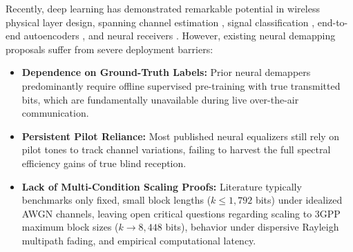 \documentclass[journal]{IEEEtran}
\begin{document}
Recently, deep learning has demonstrated remarkable potential in wireless physical layer design, spanning channel estimation \cite{soltani2019deep}, signal classification \cite{o2017introduction}, end-to-end autoencoders \cite{dorner2018deep}, and neural receivers \cite{ye2018power, he2020model, shlezinger2020viterbinet, simeone2018very}. However, existing neural demapping proposals suffer from severe deployment barriers:
\begin{itemize}
    \item \textbf{Dependence on Ground-Truth Labels:} Prior neural demappers predominantly require offline supervised pre-training with true transmitted bits, which are fundamentally unavailable during live over-the-air communication.
    \item \textbf{Persistent Pilot Reliance:} Most published neural equalizers still rely on pilot tones to track channel variations, failing to harvest the full spectral efficiency gains of true blind reception.
    \item \textbf{Lack of Multi-Condition Scaling Proofs:} Literature typically benchmarks only fixed, small block lengths ($k \le 1,792$ bits) under idealized AWGN channels, leaving open critical questions regarding scaling to 3GPP maximum block sizes ($k \to 8,448$ bits), behavior under dispersive Rayleigh multipath fading, and empirical computational latency.
\end{itemize}
\end{document}
